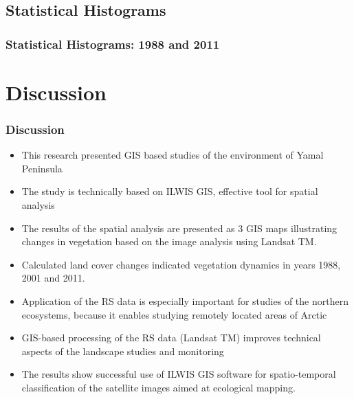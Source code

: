 \documentclass[pdflatex,compress,8pt,
	xcolor={dvipsnames,dvipsnames,svgnames,x11names,table},
	hyperref={colorlinks = true,
	breaklinks = true, 
	urlcolor = NavyBlue, 
	breaklinks = true}]{beamer}
\begin{document}
\subsection{Statistical Histograms}
\begin{frame}\frametitle{Statistical Histograms: 1988 and 2011}
\begin{figure}[H]
	\centering
			\vspace{2mm}
\end{figure}
\end{frame}

\section{Discussion}
\begin{frame}\frametitle{Discussion}
\begin{itemize}
        \item This research presented GIS based studies of the environment of Yamal Peninsula
        \item The study is technically based on ILWIS GIS, effective tool for spatial analysis
        \item The results of the spatial analysis are presented as 3 GIS maps illustrating changes in vegetation based on the image analysis using Landsat TM.
        \item Calculated land cover changes indicated vegetation dynamics in years 1988, 2001 and 2011.
        \item Application of the RS data is especially important for studies of the northern ecosystems, because it enables studying remotely located areas of Arctic
	\item GIS-based processing of the RS data (Landsat TM) improves technical aspects of the landscape studies and monitoring
	\item The results show successful use of ILWIS GIS software for spatio-temporal classification of the satellite images aimed at ecological mapping.
	\end{itemize}
\end{frame}
\end{document}
